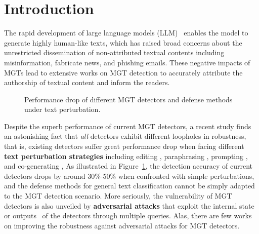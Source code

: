 \section{Introduction}
\label{sec:intro}
The rapid development of large language models (LLM)~\cite{achiam2023gpt,dubey2024llama,claude3, guo2025deepseek} enables the model to generate highly human-like texts, which has raised broad concerns about the unrestricted dissemination of non-attributed textual contents including misinformation, fabricate news, and phishing emails.
These negative impacts of MGTs lead to extensive works on MGT detection \cite{mitchell2023detectgpt, verma2024ghostbuster, liu2024does, baofast, liu2024does} to accurately attribute the authorship of textual content and inform the readers.
\begin{figure}[t]
    \centering
	\caption{Performance drop of different MGT detectors and defense methods under text perturbation\protect\footnotemark.}
    \vspace{-0.4cm}
    
    \label{fig:compare1} 
\end{figure}


Despite the superb performance of current MGT detectors, a recent study \cite{wang2024stumbling} finds an astonishing fact that \textit{all} detectors exhibit different loopholes in robustness, that is, existing detectors suffer great performance drop when facing different \textbf{text perturbation strategies} including editing \cite{kukich1992techniques, gabrilovich2002homograph}, paraphrasing \cite{shi2024red}, prompting \cite{zamfirescu2023johnny}, and co-generating \cite{kushnareva2024ai}, \etc
As illustrated in Figure~\ref{fig:compare1}, the detection accuracy of current detectors drops by around 30\%-50\% when confronted with simple perturbations, and the defense methods for general text classification cannot be simply adapted to the MGT detection scenario.
More seriously, the vulnerability of MGT detectors is also unveiled by \textbf{adversarial attacks} that exploit the internal state~\cite{yoo2021towards} or outputs~\cite{liu2024hqa,yu2024query,hu2024fasttextdodger} of the detectors through multiple queries. 
Alas, there are few works on improving the robustness against adversarial attacks for MGT detectors.


